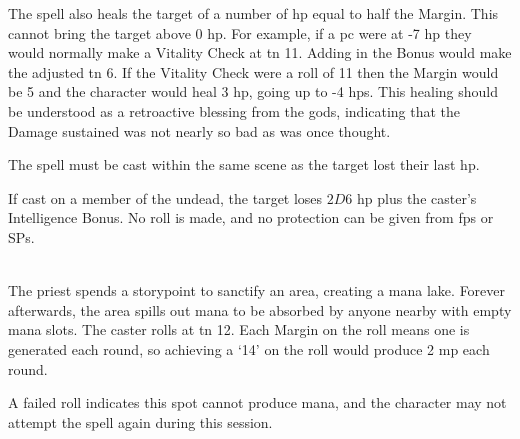 \begin{multicols}{2}
The spell also heals the target of a number of \gls{hp} equal to half the Margin.
This cannot bring the target above 0 \gls{hp}.
For example, if a \gls{pc} were at -7 \gls{hp} they would normally make a Vitality Check at \gls{tn} 11.
Adding in the Bonus would make the adjusted \gls{tn} 6.
If the Vitality Check were a roll of 11 then the Margin would be 5 and the character would heal 3 \gls{hp}, going up to -4 \glspl{hp}.
This healing should be understood as a retroactive blessing from the gods, indicating that the Damage sustained was not nearly so bad as was once thought.

The spell must be cast within the same scene as the target lost their last \gls{hp}.

If cast on a member of the undead, the target loses $2D6$ \gls{hp} plus the caster's Intelligence Bonus.
No roll is made, and no protection can be given from \glspl{fp} or \glspl{SP}.

\\
The priest spends a \gls{storypoint} to sanctify an area, creating a mana lake.
Forever afterwards, the area spills out mana to be absorbed by anyone nearby with empty mana slots.
The caster rolls at \gls{tn} 12.
Each Margin on the roll means one  is generated each round, so achieving a `14' on the roll would produce 2 \gls{mp} each round.

A failed roll indicates this spot cannot produce mana, and the character may not attempt the spell again during this session.

\end{multicols}



